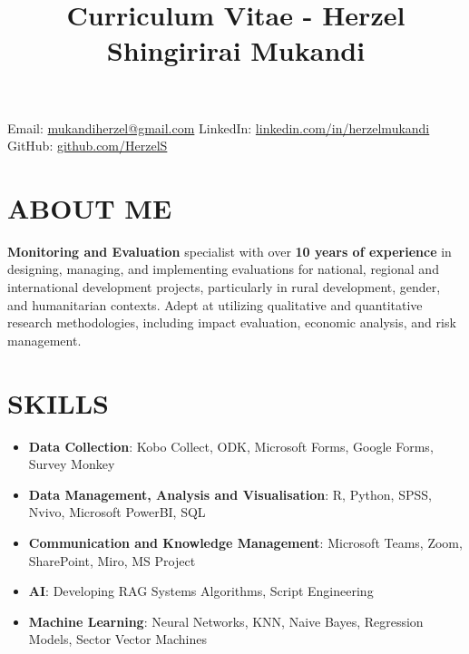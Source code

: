 \documentclass[
  10pt,
]{article}
\title{Curriculum Vitae - Herzel Shingirirai Mukandi}
\author{}
\date{\vspace{-2.5em}}
\begin{document}
\maketitle

\vspace{-2em}

\begin{center}
{\small
Email: \textcolor{blue}{\href{mailto:mukandiherzel@gmail.com}{mukandiherzel@gmail.com}} \quad
LinkedIn: \textcolor{blue}{\href{https://www.linkedin.com/in/herzelmukandi}{linkedin.com/in/herzelmukandi}} \quad
GitHub: \textcolor{blue}{\href{https://github.com/HerzelS}{github.com/HerzelS}}
}
\end{center}

\vspace{0.5em}

\section{ABOUT ME}\label{about-me}

\textbf{Monitoring and Evaluation} specialist with over \textbf{10 years
of experience} in designing, managing, and implementing evaluations for
national, regional and international development projects, particularly
in rural development, gender, and humanitarian contexts. Adept at
utilizing qualitative and quantitative research methodologies, including
impact evaluation, economic analysis, and risk management.

\vspace{0.5cm}

\section{SKILLS}\label{skills}

\begin{itemize}
\item
  \textbf{Data Collection}: Kobo Collect, ODK, Microsoft Forms, Google
  Forms, Survey Monkey
\item
  \textbf{Data Management, Analysis and Visualisation}: R, Python, SPSS,
  Nvivo, Microsoft PowerBI, SQL
\item
  \textbf{Communication and Knowledge Management}: Microsoft Teams,
  Zoom, SharePoint, Miro, MS Project
\item
  \textbf{AI}: Developing RAG Systems Algorithms, Script Engineering
\item
  \textbf{Machine Learning}: Neural Networks, KNN, Naive Bayes,
  Regression Models, Sector Vector Machines
\end{itemize}
\end{document}
